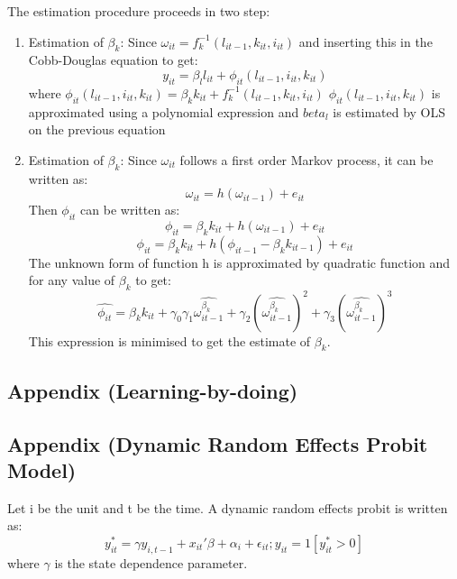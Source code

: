 \documentclass[12pt]{article}
\begin{document}
The estimation procedure proceeds in two step:
\begin{enumerate}
\item Estimation of $\beta_{k}$:
Since $\omega_{it}=f_{k}^{-1}(l_{it-1},k_{it},i_{it})$ and inserting
this in the Cobb-Douglas equation to get: 
$$ y_{it} = \beta_{l}l_{it} + \phi_{it}(l_{it-1},i_{it},k_{it})$$
where $\phi_{it}(l_{it-1},i_{it},k_{it}) =  \beta_{k}k_{it}+ f_{k}^{-1}(l_{it-1},k_{it},i_{it})$
$\phi_{it}(l_{it-1},i_{it},k_{it})$ is approximated using a polynomial
expression and $beta_{l}$ is estimated by  OLS on the previous
equation
\item Estimation of $\beta_{k}$:
Since $\omega_{it}$ follows a first order Markov process, it can be
written as: 
$$ \omega_{it} = h(\omega_{it-1}) + e_{it}$$
Then $\phi_{it}$ can be written as: 
$$ \phi_{it} = \beta_{k}k_{it} + h(\omega_{it-1}) + e_{it}$$
$$ \phi_{it} = \beta_{k}k_{it} + h(\phi_{it-1}- \beta_{k}k_{it-1}) + e_{it}$$
The unknown form of function h is approximated by quadratic function
and for any value of $\beta_k$ to get:
$$ \hat{\phi_{it}} = \beta_{k}k_{it} +\gamma_{0}
\gamma_{1}\hat{\omega_{it-1}^{\beta_{k}}}+
\gamma_{2}(\hat{\omega_{it-1}^{\beta_{k}}})^{2}
+ \gamma_{3}(\hat{\omega_{it-1}^{\beta_{k}}})^{3} $$
 This expression is minimised to get the estimate of $\beta_{k}$. 
\end{enumerate}

\newpage
{}
\subsection{Appendix (Learning-by-doing)}\label{apendix:lbd}


 
\restoregeometry

 


\subsection{Appendix (Dynamic Random Effects Probit  Model)}\label{apendix:random}
Let i be the unit and t be the time. A dynamic random effects probit
is written as: 
$$ y_{it}^{*} = \gamma y_{i,t-1} + x_{it}'\beta + \alpha_{i} +
\epsilon_{it}; y_{it}=1[y_{it}^{*} > 0]$$
where $\gamma$ is the state dependence parameter.
\end{document}
